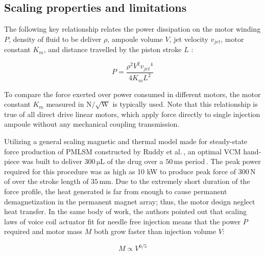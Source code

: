     
    \subsection{Scaling properties and limitations} \label{Chapter:background/voice coil motors for NFJI/scaling and limitation}
    
    
    The following key relationship relates the power dissipation on the motor winding $P$, density of fluid to be deliver $\rho$, ampoule volume $V$, jet velocity $v_{jet}$, motor constant $K_m$, and distance travelled by the piston stroke $L$ \cite{Williams2012}:
    
    
    \begin{equation}
        P=\frac{\rho^2 V^2 {v_{jet}}^4}{4 K_m L^2}
        \label{eq:power required for F,V,v_jet,K_m, and L}
    \end{equation}
    
    
    To compare the force exerted over power consumed in different motors, the motor constant $K_m$ measured in $\mathrm{N/\sqrt{W}}$  is typically used. Note that this relationship is true of all direct drive linear motors, which apply force directly to single injection ampoule without any mechanical coupling transmission.
    
    
    Utilizing a general scaling magnetic and thermal model made for steady-state force production of \ac{PMLSM} constructed by Ruddy et al.\,\cite{Ruddy2011DesignMotors}, an optimal \acs{VCM} hand-piece was built to deliver $\mathrm{300\,\mu L}$ of the drug over a $\mathrm{50\,ms}$ period\,\cite{taberner2006}. The peak power required for this procedure was as high as 10 kW to produce peak force of $\mathrm{300\,N}$ of over the stroke length of $\mathrm{35\,mm}$. Due to the extremely short duration of the force profile, the heat generated is far from enough to cause permanent demagnetization in the permanent magnet array; thus, the motor design neglect heat transfer. In the same body of work, the authors pointed out that scaling laws of voice coil actuator fit for needle free injection means that the power $P$ required and motor mass $M$ both grow faster than injection volume $V$:
    
    
    \begin{equation}
        M \propto V^{6/5}
        \label{eq:scaling property of VCM}
    \end{equation}


